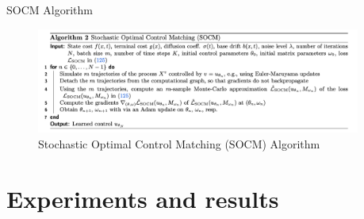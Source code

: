 \documentclass[aspectratio=169,xcolor=dvipsnames]{beamer}
\begin{document}

\begin{frame}{SOCM Algorithm}
    \begin{figure}
        \centering
        \includegraphics[width=0.95\textwidth]{figures/SOCM_algo.png}
        \caption{Stochastic Optimal Control Matching (SOCM) Algorithm}
    \end{figure}
\end{frame}



\section{Experiments and results}
\end{document}
